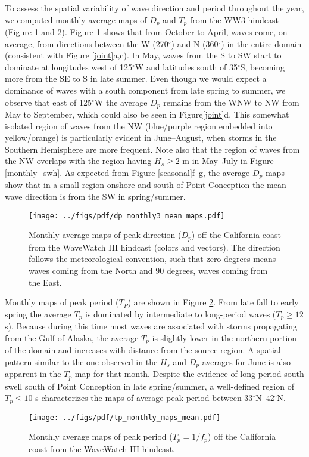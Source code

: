 To assess the spatial variability of wave direction and period throughout the year, we computed monthly average maps of $D_p$ and $T_p$ from the WW3 hindcast (Figure \ref{direction} and \ref{period}). Figure \ref{direction} shows that from October to April, waves come, on average, from directions between the W (270$^\circ$) and N (360$^\circ$) in the entire domain (consistent with Figure \ref{joint}a,c).
In May, waves from the S to SW start to dominate at longitudes west of 125$^\circ$W and latitudes south of 35$^\circ$S, becoming more from the SE to S in late summer. Even though we would expect a dominance of waves with a south component from late spring to summer, we observe that east of 125$^\circ$W the average $D_p$ remains from the WNW to NW from May to September, which could also be seen in Figure\ref{joint}d. This somewhat isolated region of waves from the NW (blue/purple region embedded into yellow/orange) is particularly evident in June--August, when storms in the Southern Hemisphere are more frequent. Note also that the region of waves from the NW overlaps with the region having $H_s \geq 2$ m in May--July in Figure \ref{monthly_swh}. As expected from Figure \ref{seasonal}f--g, the average $D_p$ maps show that in a small region onshore and south of Point Conception the mean wave direction is from the SW in spring/summer. 
\begin{figure}[h]
\centering
\texttt{[image: ../figs/pdf/dp\_monthly3\_mean\_maps.pdf]}
\caption{Monthly average maps of peak direction ($D_p$) off the California coast from the WaveWatch III hindcast (colors and vectors). The direction follows the meteorological convention, such that zero degrees means waves coming from the North and 90 degrees, waves coming from the East.}
\label{direction}
\end{figure}

Monthly maps of peak period ($T_P$) are shown in Figure \ref{period}. From late fall to early spring the average $T_p$ is dominated by intermediate to long-period waves ($T_p\geq12$ s). Because during this time most waves are associated with storms propagating from the Gulf of Alaska, the average $T_p$ is slightly lower in the northern portion of the domain and increases with distance from the source region. A spatial pattern similar to the one observed in the $H_s$ and $D_p$ averages for June is also apparent in the $T_p$ map for that month. Despite the evidence of long-period south swell south of Point Conception in late spring/summer, a well-defined region of $T_p\leq10$ s characterizes the maps of average peak period between 33$^\circ$N--42$^\circ$N.
\begin{figure}[h]
\centering
\texttt{[image: ../figs/pdf/tp\_monthly\_maps\_mean.pdf]}
\caption{Monthly average maps of peak period ($T_p = 1/f_p$) off the California coast from the WaveWatch III hindcast.}
\label{period}
\end{figure}

